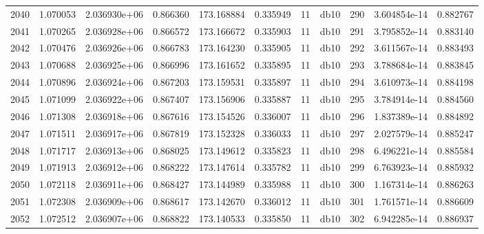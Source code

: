 \begin{tabular}{lrrrrrrlrrr}
2040 &    1.070053 &        2.036930e+06 &  0.866360 &              173.168884 &    0.335949 &      11 &         db10 &    290 &   3.604854e-14 &      0.882767 \\
2041 &    1.070265 &        2.036928e+06 &  0.866572 &              173.166672 &    0.335903 &      11 &         db10 &    291 &   3.795852e-14 &      0.883140 \\
2042 &    1.070476 &        2.036926e+06 &  0.866783 &              173.164230 &    0.335905 &      11 &         db10 &    292 &   3.611567e-14 &      0.883493 \\
2043 &    1.070688 &        2.036925e+06 &  0.866996 &              173.161652 &    0.335895 &      11 &         db10 &    293 &   3.788684e-14 &      0.883845 \\
2044 &    1.070896 &        2.036924e+06 &  0.867203 &              173.159531 &    0.335897 &      11 &         db10 &    294 &   3.610973e-14 &      0.884198 \\
2045 &    1.071099 &        2.036922e+06 &  0.867407 &              173.156906 &    0.335887 &      11 &         db10 &    295 &   3.784914e-14 &      0.884560 \\
2046 &    1.071308 &        2.036918e+06 &  0.867616 &              173.154526 &    0.336007 &      11 &         db10 &    296 &   1.837389e-14 &      0.884892 \\
2047 &    1.071511 &        2.036917e+06 &  0.867819 &              173.152328 &    0.336033 &      11 &         db10 &    297 &   2.027579e-14 &      0.885247 \\
2048 &    1.071717 &        2.036913e+06 &  0.868025 &              173.149612 &    0.335823 &      11 &         db10 &    298 &   6.496221e-14 &      0.885584 \\
2049 &    1.071913 &        2.036912e+06 &  0.868222 &              173.147614 &    0.335782 &      11 &         db10 &    299 &   6.763923e-14 &      0.885932 \\
2050 &    1.072118 &        2.036911e+06 &  0.868427 &              173.144989 &    0.335988 &      11 &         db10 &    300 &   1.167314e-14 &      0.886263 \\
2051 &    1.072308 &        2.036909e+06 &  0.868617 &              173.142670 &    0.336012 &      11 &         db10 &    301 &   1.761571e-14 &      0.886609 \\
2052 &    1.072512 &        2.036907e+06 &  0.868822 &              173.140533 &    0.335850 &      11 &         db10 &    302 &   6.942285e-14 &      0.886937 \\

\end{tabular}
